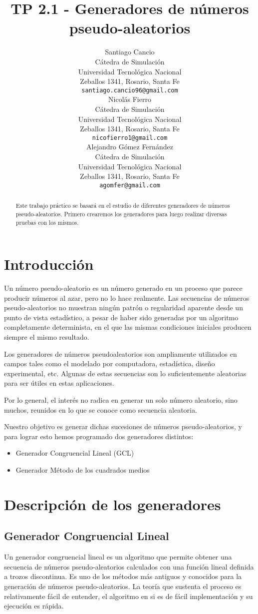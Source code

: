 \documentclass{article}
\title{TP 2.1 - Generadores de números pseudo-aleatorios}
\author{
 Santiago Cancio \\
  Cátedra de Simulación\\
  Universidad Tecnológica Nacional\\
  Zeballos 1341, Rosario, Santa Fe \\
  \texttt{santiago.cancio96@gmail.com} \\
   \And
 Nicolás Fierro \\
  Cátedra de Simulación\\
  Universidad Tecnológica Nacional \\
  Zeballos 1341, Rosario, Santa Fe\\
  \texttt{nicofierro1@gmail.com} \\
  \And
 Alejandro Gómez Fernández \\
  Cátedra de Simulación\\
  Universidad Tecnológica Nacional \\
  Zeballos 1341, Rosario, Santa Fe\\
  \texttt{agomfer@gmail.com} \\
}
\begin{document}
\maketitle
\begin{abstract}
Este trabajo práctico se basará en el estudio de diferentes generadores de números pseudo-aleatorios. Primero crearemos los generadores para luego realizar diversas pruebas con los mismos.
\end{abstract}




\section{Introducción}
Un número pseudo-aleatorio es un número generado en un proceso que parece producir números al azar, pero no lo hace realmente. Las secuencias de números pseudo-aleatorios no muestran ningún patrón o regularidad aparente desde un punto de vista estadístico, a pesar de haber sido generadas por un algoritmo completamente determinista, en el que las mismas condiciones iniciales producen siempre el mismo resultado.

Los generadores de números pseudoaleatorios son ampliamente utilizados en campos tales como el modelado por computadora, estadística, diseño experimental, etc. Algunas de estas secuencias son lo suficientemente aleatorias para ser útiles en estas aplicaciones.

Por lo general, el interés no radica en generar un solo número aleatorio, sino muchos, reunidos en lo que se conoce como secuencia aleatoria.

Nuestro objetivo es generar dichas sucesiones de números pseudo-aleatorios, y para lograr esto hemos programado dos generadores distintos:

\begin{itemize}
\item Generador Congruencial Lineal (GCL)
\item Generador Método de los cuadrados medios
\end{itemize}

\section{Descripción de los generadores}
\label{sec:headings}
\subsection{Generador Congruencial Lineal}
Un generador congruencial lineal es un algoritmo que permite obtener una secuencia de números pseudo-aleatorios calculados con una función lineal definida a trozos discontinua. Es uno de los métodos más antiguos y conocidos para la generación de números pseudo-aleatorios. La teoría que sustenta el proceso es relativamente fácil de entender, el algoritmo en si es de fácil implementación y su ejecución es rápida.
\end{document}
